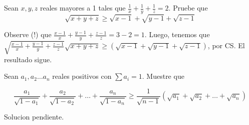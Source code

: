 \begin{ejer}
	Sean $x, y, z$ reales mayores a 1 tales que $\frac{1}{x} +\frac{1}{y} + \frac{1}{z} = 2$. Pruebe que
	\begin{equation}
	\sqrt{x+y+z} \geq \sqrt{x-1} + \sqrt{y-1} + \sqrt{z-1} 
	\end{equation}
\end{ejer}
\begin{sol}
	Observe (!) que $\frac{x-1}{x} + \frac{y-1}{y} + \frac{z-1}{z} = 3 -2 = 1$. Luego, tenemos que $\sqrt{\frac{x-1}{x} + \frac{y-1}{y} + \frac{z-1}{z}}\sqrt{x+y+z} \geq (\sqrt{x-1} + \sqrt{y-1} + \sqrt{z-1})$, por CS. El resultado sigue.
\end{sol}

\begin{ejer}
	Sean $a_{1}, a_{2} \dots a_{n}$ reales positivos con $\sum a_{i} = 1$. Muestre que
	
	\begin{equation}
	\frac{a_{1}}{\sqrt{1-a_{1}}} +\frac{a_{2}}{\sqrt{1-a_{2}}} + \dots + \frac{a_{n}}{\sqrt{1-a_{n}}} \geq \frac{1}{\sqrt{n-1}} (\sqrt{a_{1}} + \sqrt{a_{2}} + \dots + \sqrt{a_{n}})
	\end{equation}
\end{ejer}

\begin{sol}
	Solucion pendiente.
\end{sol}